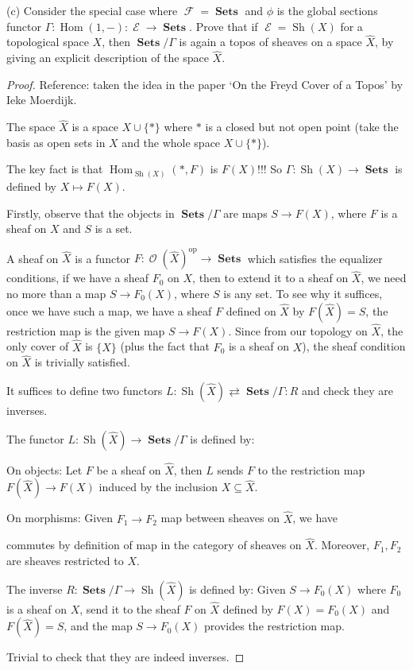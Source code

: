 \documentclass[a4paper]{article}
\DeclareMathOperator{\Sets}{\mathbf {Sets}}
\DeclareMathOperator{\op}{op}
\DeclareMathOperator{\Hom}{\text {Hom}}
\DeclareMathOperator{\Sh}{\text {Sh}}
\DeclareMathOperator{\E}{\mathcal E}
\DeclareMathOperator{\F}{\mathcal F}
\DeclareMathOperator{\mcO}{\mathcal {O}}
\begin{document}
(c) Consider the special case where $\F=\Sets$ and $\phi$ is the global sections functor $\Gamma:\Hom(1,-):\E\to \Sets$. Prove that if $\E=\Sh(X)$ for a topological space $X$, then $\Sets/\Gamma$ is again a topos of sheaves on a space $\hat{X}$, by giving an explicit description of the space $\hat{X}$.
\begin{proof}
    Reference: taken the idea in the paper `On the Freyd Cover of a Topos' by Ieke Moerdijk.

    The space $\hat{X}$ is a space $X\cup \{*\}$ where $*$ is a closed but not open point (take the basis as open sets in $X$ and the whole space $X\cup \{*\}$). 
    
    The key fact is that $\Hom_{\Sh(X)}(*,F)$ is $F(X)$!!! So $\Gamma:\Sh(X)\to \Sets$ is defined by $X\mapsto F(X)$.

    Firstly, observe that the objects in $\Sets/\Gamma$ are maps $S\to F(X)$, where $F$ is a sheaf on $X$ and $S$ is a set. 
    
    A sheaf on $\hat{X}$ is a functor $F:\mcO(\hat{X})^{\op}\to \Sets$ which satisfies the equalizer conditions, if we have a sheaf $F_0$ on $X$, then to extend it to a sheaf on $\hat{X}$, we need no more than a map $S\to F_0(X)$, where $S$ is any set. To see why it suffices, once we have such a map, we have a sheaf $F$ defined on $\hat{X}$ by $F(\hat{X})=S$, the restriction map is the given map $S\to F(X)$. Since from our topology on $\hat{X}$, the only cover of $\hat{X}$ is $\{\hat{X}\}$ (plus the fact that $F_0$ is a sheaf on $X$), the sheaf condition on $\hat{X}$ is trivially satisfied. 
    

    It suffices to define two functors $L:\Sh(\hat{X})\rightleftarrows\Sets/\Gamma : R$ and check they are inverses.

    The functor $L:\Sh(\hat{X})\to \Sets/\Gamma$ is defined by:

    On objects: Let $F$ be a sheaf on $\hat{X}$, then $L$ sends $F$ to the restriction map $F(\hat{X})\to F(X)$ induced by the inclusion $X\subseteq \hat{X}$.

    On morphisms: Given $F_1\to F_2$ map between sheaves on $\hat{X}$, we have 
    \begin{center}
    \end{center}

    commutes by definition of map in the category of sheaves on $\hat{X}$. Moreover, $F_1,F_2$ are sheaves restricted to $X$.

    The inverse $R:\Sets/\Gamma \to \Sh(\hat{X})$ is defined by: Given $S\to F_0(X)$ where $F_0$ is a sheaf on $X$, send it to the sheaf $F$ on $\hat{X}$ defined by $F(X)=F_0(X)$ and $F(\hat{X})=S$, and the map $S\to F_0(X)$ provides the restriction map.

    Trivial to check that they are indeed inverses.


  
\end{proof}
\end{document}
